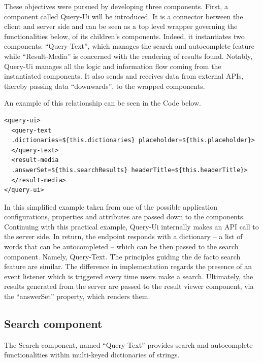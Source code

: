 These objectives were pursued by developing three components. First, a component called Query-Ui will be introduced. It is a connector between the client and server side and can be seen as a top level wrapper governing the functionalities below, of its children’s components. Indeed, it instantiates two components: “Query-Text”, which manages the search and autocomplete feature while “Result-Media” is concerned with the rendering of results found.
Notably, Query-Ui manages all the logic and information flow coming from the instantiated components. It also sends and receives data from external APIs, thereby passing data “downwards”, to the wrapped components.

An example of this relationship can be seen in the Code below.
\\
\begin{lstlisting}[caption={Query-Ui component instantiation},label={queryUi}, language=HTML5]
<query-ui>
  <query-text 
  .dictionaries=${this.dictionaries} placeholder=${this.placeholder}>
  </query-text>
  <result-media 
  .answerSet=${this.searchResults} headerTitle=${this.headerTitle}>
  </result-media>
</query-ui>
\end{lstlisting}

In this simplified example taken from one of the possible application configurations, properties and attributes are passed down to the components. Continuing with this practical example, Query-Ui internally makes an API call to the server side. In return, the endpoint responds with a dictionary – a list of words that can be autocompleted – which can be then passed to the search component. Namely, Query-Text. The principles guiding the de facto search feature are similar. The difference in implementation regards the presence of an event listener which is triggered every time users make a search. Ultimately, the results generated from the server are passed to the result viewer component, via the “answerSet” property, which renders them.

\subsection{Search component}
\label{subsec:searchComponents}

The Search component, named “Query-Text” provides search and autocomplete functionalities within multi-keyed dictionaries of strings.

